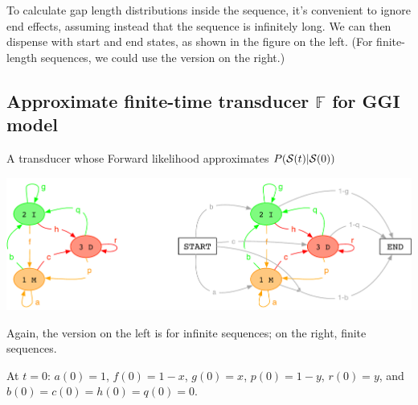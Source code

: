 \documentclass{article}
\begin{document}
To calculate gap length distributions inside the sequence, it's convenient to ignore end effects,
assuming instead that the sequence is infinitely long.
We can then dispense with start and end states, as shown in the figure on the left.
(For finite-length sequences, we could use the version on the right.)

\subsection{Approximate finite-time transducer $\mathbb{F}$ for GGI model}

A transducer whose Forward likelihood approximates $P({\cal S}(t)|{\cal S}(0))$

\includegraphics[width=\textwidth]{PairHMM.pdf}

Again, the version on the left is for infinite sequences; on the right, finite sequences.

At $t=0$: $a(0)=1$, $f(0)=1-x$, $g(0)=x$, $p(0)=1-y$, $r(0)=y$, and $b(0)=c(0)=h(0)=q(0)=0$.
\end{document}
